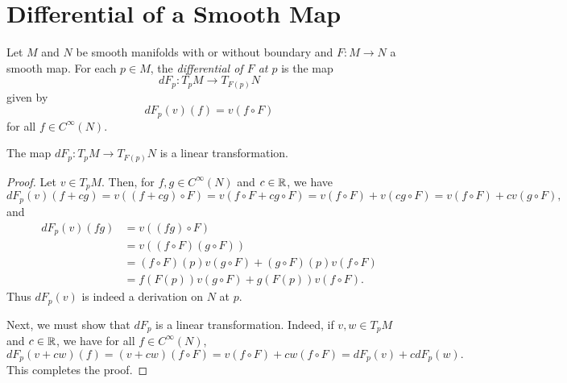 \section{Differential of a Smooth Map}

\begin{definition}[Differential]
    Let $M$ and $N$ be smooth manifolds with or without boundary and $F: M\to N$ a smooth map. For each $p\in M$, the \emph{differential of $F$ at $p$} is the map 
    \begin{equation*}
        dF_p: T_pM\to T_{F(p)}N
    \end{equation*}
    given by 
    \begin{equation*}
        dF_p(v)(f) = v(f\circ F)
    \end{equation*}
    for all $f\in C^\infty(N)$.
\end{definition}

\begin{proposition}
    The map $dF_p: T_pM\to T_{F(p)}N$ is a linear transformation.
\end{proposition}
\begin{proof}
    Let $v\in T_pM$. Then, for $f,g\in C^\infty(N)$ and $c\in\mathbb{R}$, we have 
    \begin{equation*}
        dF_p(v)(f + cg) = v((f + cg)\circ F) = v(f\circ F + cg\circ F) = v(f\circ F) + v(cg\circ F) = v(f\circ F) + cv(g\circ F),
    \end{equation*}
    and 
    \begin{align*}
        dF_p(v)(fg) &= v((fg)\circ F)\\
        &= v((f\circ F)(g\circ F)) \\
        &= (f\circ F)(p)v(g\circ F) + (g\circ F)(p)v(f\circ F)\\
        &= f(F(p))v(g\circ F) + g(F(p))v(f\circ F).
    \end{align*}
    Thus $dF_p(v)$ is indeed a derivation on $N$ at $p$.

    Next, we must show that $dF_p$ is a linear transformation. Indeed, if $v,w\in T_pM$ and $c\in\mathbb{R}$, we have for all $f\in C^\infty(N)$, 
    \begin{equation*}
        dF_p(v + cw)(f) = (v + cw)(f\circ F) = v(f\circ F) + cw(f\circ F) = dF_p(v) + cdF_p(w).
    \end{equation*}
    This completes the proof.
\end{proof}

